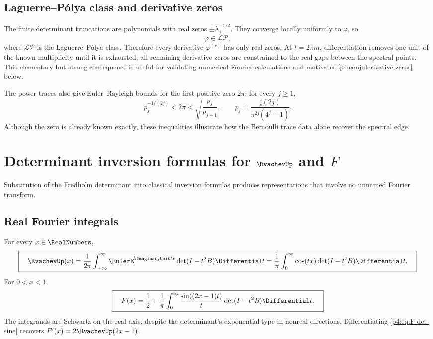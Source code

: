 \documentclass[11pt]{article}
\theoremstyle{definition}
\theoremstyle{remark}
\newcommand{\phiF}{\varphi}
\begin{document}
\subsection{Laguerre--P\'olya class and derivative zeros}

The finite determinant truncations are polynomials with real zeros
\(\pm\lambda_j^{-1/2}\).  They converge locally uniformly to \(\phiF\), so
\begin{equation}
 \phiF\in\mathcal{LP},
 \label{p4:eq:phi-LP}
\end{equation}
where \(\mathcal{LP}\) is the Laguerre--P\'olya class.  Therefore every derivative
\(\phiF^{(r)}\) has only real zeros.  At \(t=2\pi m\), differentiation removes one
unit of the known multiplicity until it is exhausted; all remaining derivative zeros
are constrained to the real gaps between the spectral points.  This elementary but
strong consequence is useful for validating numerical Fourier calculations and
motivates \cref{p4:conj:derivative-zeros} below.

The power traces also give Euler--Rayleigh bounds for the first positive zero
\(2\pi\): for every \(j\ge1\),
\begin{equation}
 p_j^{-1/(2j)}<2\pi<\sqrt{\frac{p_j}{p_{j+1}}},
 \qquad
 p_j=\frac{\zeta(2j)}{\pi^{2j}(4^j-1)}.
 \label{p4:eq:Euler-Rayleigh}
\end{equation}
Although the zero is already known exactly, these inequalities illustrate how the
Bernoulli trace data alone recover the spectral edge.

\section[Determinant inversion formulas for up and F]{Determinant inversion formulas for \(\RvachevUp\) and \(F\)}
\label{p4:sec:det-inversion}

Substitution of the Fredholm determinant into classical inversion formulas produces
representations that involve no unnamed Fourier transform.

\subsection{Real Fourier integrals}

For every \(x\in\RealNumbers\),
\begin{equation}
 \boxed{\quad
 \RvachevUp(x)=\frac1{2\pi}\int_{-\infty}^{\infty}
 \EulerE^{\ImaginaryUnit tx}\det(I-t^2B)\Differential t
 =\frac1\pi\int_0^\infty\cos(tx)\det(I-t^2B)\Differential t.
 \quad}
 \label{p4:eq:up-det-Fourier}
\end{equation}
For \(0<x<1\),
\begin{equation}
 \boxed{\quad
 F(x)=\frac12+\frac1\pi\int_0^\infty
 \frac{\sin((2x-1)t)}t\det(I-t^2B)\Differential t.
 \quad}
 \label{p4:eq:F-det-sine}
\end{equation}
The integrands are Schwartz on the real axis, despite the determinant's exponential
type in nonreal directions.  Differentiating \eqref{p4:eq:F-det-sine} recovers
\(F'(x)=2\RvachevUp(2x-1)\).
\end{document}
